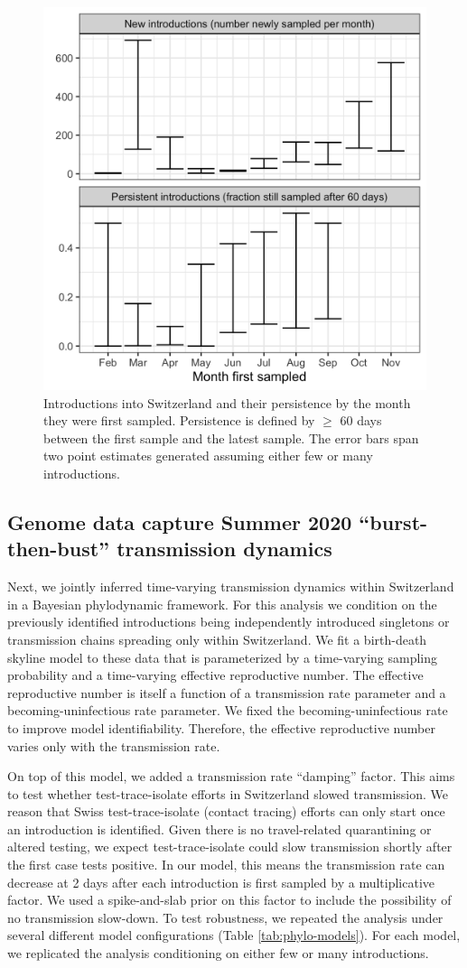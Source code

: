 \documentclass[9pt,twoside,lineno]{pnas-new} %
\begin{document}
\begin{figure}[H]
\centering
\includegraphics[width=.4\linewidth]{figures/introductions_and_persistance.png}
\caption{Introductions into Switzerland and their persistence by the month they were first sampled. Persistence is defined by $\geq$ 60 days between the first sample and the latest sample. The error bars span two point estimates generated assuming either few or many introductions.}
\label{fig:chain-longevity}
\end{figure}

\subsection{Genome data capture Summer 2020 ``burst-then-bust'' transmission dynamics}

Next, we jointly inferred time-varying transmission dynamics within Switzerland in a Bayesian phylodynamic framework. For this analysis we condition on the previously identified introductions being independently introduced singletons or transmission chains spreading only within Switzerland. We fit a birth-death skyline model to these data that is parameterized by a time-varying sampling probability and a time-varying effective reproductive number. The effective reproductive number is itself a function of a transmission rate parameter and a becoming-uninfectious rate parameter. We fixed the becoming-uninfectious rate to improve model identifiability. Therefore, the effective reproductive number varies only with the transmission rate. 

On top of this model, we added a transmission rate ``damping'' factor. This aims to test whether test-trace-isolate efforts in Switzerland slowed transmission. We reason that Swiss test-trace-isolate (contact tracing) efforts can only start once an introduction is identified. Given there is no travel-related quarantining or altered testing, we expect test-trace-isolate could slow transmission shortly after the first case tests positive. In our model, this means the transmission rate can decrease at 2 days after each introduction is first sampled by a multiplicative factor. We used a spike-and-slab prior on this factor to include the possibility of no transmission slow-down. To test robustness, we repeated the analysis under several different model configurations (Table \ref{tab:phylo-models}). For each model, we replicated the analysis conditioning on either few or many introductions. 
\end{document}
